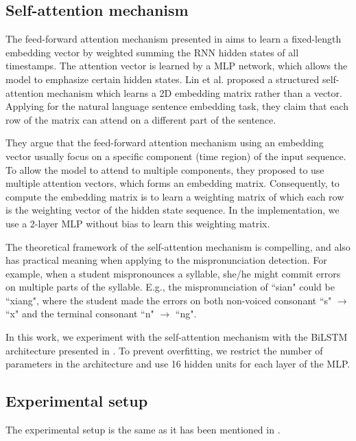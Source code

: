 \subsection{Self-attention mechanism}

The feed-forward attention mechanism presented in  aims to learn a fixed-length embedding vector by weighted summing the \gls{RNN} hidden states of all timestamps. The attention vector is learned by a \gls{MLP} network, which allows the model to emphasize certain hidden states. Lin et al. \cite{Lin2017} proposed a structured self-attention mechanism which learns a 2D embedding matrix rather than a vector. Applying for the natural language sentence embedding task, they claim that each row of the matrix can attend on a different part of the sentence. 

They argue that the feed-forward attention mechanism using an embedding vector usually focus on a specific component (time region) of the input sequence. To allow the model to attend to multiple components, they proposed to use multiple attention vectors, which forms an embedding matrix. Consequently, to compute the embedding matrix is to learn a weighting matrix of which each row is the weighting vector of the hidden state sequence. In the implementation, we use a 2-layer \gls{MLP} without bias to learn this weighting matrix.

The theoretical framework of the self-attention mechanism is compelling, and also has practical meaning when applying to the mispronunciation detection. For example, when a student mispronounces a syllable, she/he might commit errors on multiple parts of the syllable. E.g., the mispronunciation of ``sian" could be ``xiang", where the student made the errors on both non-voiced consonant ``s" $\rightarrow$ ``x" and the terminal consonant ``n" $\rightarrow$ ``ng".

In this work, we experiment with the self-attention mechanism with the \gls{BiLSTM} architecture presented in . To prevent overfitting, we restrict the number of parameters in the architecture and use 16 hidden units for each layer of the \gls{MLP}.

\subsection{Experimental setup}

The experimental setup is the same as it has been mentioned in .

